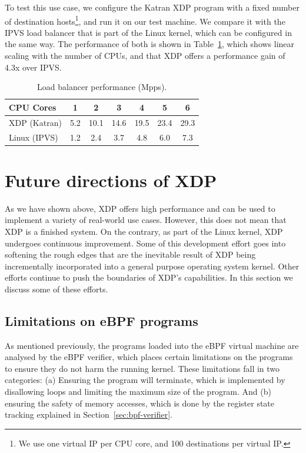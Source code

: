 \documentclass[sigconf]{acmart}
\begin{document}
To test this use case, we configure the Katran XDP program with a fixed number
of destination hosts\footnote{We use one virtual IP per CPU core, and 100
  destinations per virtual IP.}, and run it on our test machine. We compare it
with the IPVS load balancer that is part of the Linux kernel, which can be
configured in the same way. The performance of both is shown in
Table~\ref{tbl:load-balancer}, which shows linear scaling with the number of
CPUs, and that XDP offers a performance gain of 4.3x over IPVS.

\begin{table}[tbp]
\caption{\label{tbl:load-balancer}Load balancer performance (Mpps).}
\centering
\begin{tabular}{lcccccc}
  \toprule
  CPU Cores & 1   &  2  &  3  &  4  &  5  &  6  \\
  \midrule
  XDP (Katran) & 5.2 & 10.1 & 14.6 & 19.5 & 23.4 & 29.3 \\
  Linux (IPVS) & 1.2 & 2.4 & 3.7 & 4.8 & 6.0 & 7.3 \\
\bottomrule
\end{tabular}
\end{table}


\section{Future directions of XDP}
\label{sec:future}
As we have shown above, XDP offers high performance and can be used to implement
a variety of real-world use cases. However, this does not mean that XDP is a
finished system. On the contrary, as part of the Linux kernel, XDP undergoes
continuous improvement. Some of this development effort goes into softening the
rough edges that are the inevitable result of XDP being incrementally
incorporated into a general purpose operating system kernel. Other efforts
continue to push the boundaries of XDP's capabilities. In this section we
discuss some of these efforts.

\subsection{Limitations on eBPF programs}
\label{sec:limit-ebpf-progr}

As mentioned previously, the programs loaded into the eBPF virtual machine are
analysed by the eBPF verifier, which places certain limitations on the programs
to ensure they do not harm the running kernel. These limitations fall in two
categories: (a) Ensuring the program will terminate, which is implemented by
disallowing loops and limiting the maximum size of the program. And (b) ensuring
the safety of memory accesses, which is done by the register state tracking
explained in Section~\ref{sec:bpf-verifier}.
\end{document}
